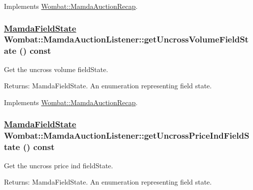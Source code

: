 Implements \hyperlink{classWombat_1_1MamdaAuctionRecap_e18a4d3e141bc54c23b8e36c54e5b073}{Wombat::Mamda\-Auction\-Recap}.\hypertarget{classWombat_1_1MamdaAuctionListener_8c84b078ac2c5e02cbb1dea5810cca7a}{
\subsubsection[getUncrossVolumeFieldState]{\setlength{\rightskip}{0pt plus 5cm}\hyperlink{namespaceWombat_93aac974f2ab713554fd12a1fa3b7d2a}{Mamda\-Field\-State} Wombat::Mamda\-Auction\-Listener::get\-Uncross\-Volume\-Field\-State () const}}
\label{classWombat_1_1MamdaAuctionListener_8c84b078ac2c5e02cbb1dea5810cca7a}


Get the uncross volume field\-State. 

\begin{Desc}
\item[Returns:]Mamda\-Field\-State. An enumeration representing field state. \end{Desc}


Implements \hyperlink{classWombat_1_1MamdaAuctionRecap_b266597424a229c509ca514324c11808}{Wombat::Mamda\-Auction\-Recap}.\hypertarget{classWombat_1_1MamdaAuctionListener_99612e2b16ee7630f35ec21060109b11}{
\subsubsection[getUncrossPriceIndFieldState]{\setlength{\rightskip}{0pt plus 5cm}\hyperlink{namespaceWombat_93aac974f2ab713554fd12a1fa3b7d2a}{Mamda\-Field\-State} Wombat::Mamda\-Auction\-Listener::get\-Uncross\-Price\-Ind\-Field\-State () const}}
\label{classWombat_1_1MamdaAuctionListener_99612e2b16ee7630f35ec21060109b11}


Get the uncross price ind field\-State. 

\begin{Desc}
\item[Returns:]Mamda\-Field\-State. An enumeration representing field state. \end{Desc}


